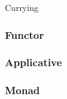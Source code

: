 \documentclass{beamer}
\begin{document}
\begin{frame}{Currying}

\end{frame}

\begin{frame}
\frametitle{Functor}
	
\end{frame}

\begin{frame}
\frametitle{Applicative}
	\textmd{}
\end{frame}

\begin{frame}
\frametitle{Monad}
	

\end{frame}
\end{document}
